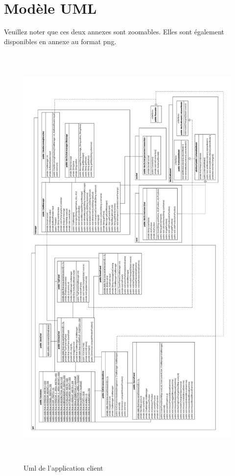\documentclass[a4paper,12pt]{report}
\begin{document}
    \section{Modèle UML}
      Veuillez noter que ces deux annexes sont zoomables. Elles sont également disponibles en annexe au format png.
      \medbreak
      \begin{figure}[!ht]%
        \centering 
        \includegraphics[height=22cm]{umlClientTurn.png}
        \caption{Uml de l'application client}
      \end{figure}
      \bigbreak
\end{document}
